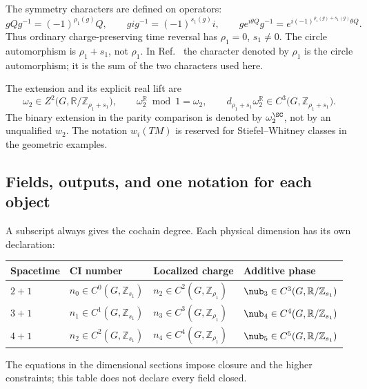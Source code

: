 The symmetry characters are defined on operators:
\begin{equation}\label{eq:characters}
 gQg^{-1}=(-1)^{\rho_1(g)}Q,\qquad
 gig^{-1}=(-1)^{s_1(g)}i,\qquad
 g e^{i\theta Q}g^{-1}=e^{i(-1)^{\rho_1(g)+s_1(g)}\theta Q}.
\end{equation}
Thus ordinary charge-preserving time reversal has $\rho_1=0$, $s_1\ne0$. The circle automorphism is $\rho_1+s_1$, not $\rho_1$. In Ref.~\cite{WQFCG} the character denoted by $\rho_1$ is the circle automorphism; it is the sum of the two characters used here.

The extension and its explicit real lift are
\begin{equation}\label{eq:omega}
 \omega_2\in Z^2\bigl(G,\mathbb R/\mathbb Z_{\rho_1+s_1}\bigr),
 \qquad \omega_2^{\mathbb R}\bmod1=\omega_2,
 \qquad d_{\rho_1+s_1}\omega_2^{\mathbb R}\in C^3\bigl(G,\mathbb Z_{\rho_1+s_1}\bigr).
\end{equation}
The binary extension in the parity comparison is denoted by $\omega_2^{\SC}$, not by an unqualified $w_2$. The notation $w_i(TM)$ is reserved for Stiefel--Whitney classes in the geometric examples.

\subsection{Fields, outputs, and one notation for each object}
A subscript always gives the cochain degree. Each physical dimension has its own declaration:
\begin{center}
\begin{tabular}{llll}\toprule
Spacetime & CI number & Localized charge & Additive phase\\\midrule
$2+1$ & $n_0\in C^0(G,\mathbb Z_{s_1})$ & $n_2\in C^2(G,\mathbb Z_{\rho_1})$ & $\nub_3\in C^3(G,\mathbb R/\mathbb Z_{s_1})$\\
$3+1$ & $n_1\in C^1(G,\mathbb Z_{s_1})$ & $n_3\in C^3(G,\mathbb Z_{\rho_1})$ & $\nub_4\in C^4(G,\mathbb R/\mathbb Z_{s_1})$\\
$4+1$ & $n_2\in C^2(G,\mathbb Z_{s_1})$ & $n_4\in C^4(G,\mathbb Z_{\rho_1})$ & $\nub_5\in C^5(G,\mathbb R/\mathbb Z_{s_1})$\\\bottomrule
\end{tabular}
\end{center}
The equations in the dimensional sections impose closure and the higher constraints; this table does not declare every field closed.

